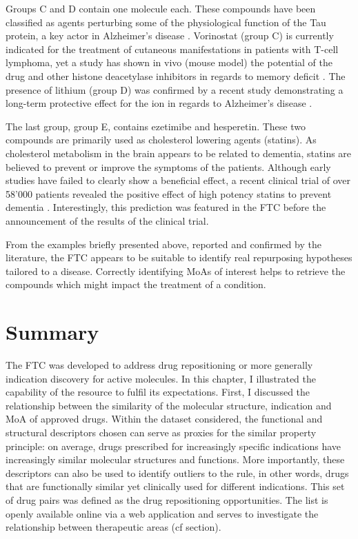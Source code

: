 Groups C and D contain one molecule each. These compounds have been classified as agents perturbing some of the physiological function of the Tau protein, a key actor in Alzheimer’s disease \citep{grundke1986abnormal}. Vorinostat (group C) is currently indicated for the treatment of cutaneous manifestations in patients with T-cell lymphoma, yet a study has shown in vivo (mouse model) the potential of the drug and other histone deacetylase inhibitors in regards to memory deficit \citep{kilgore2010inhibitors}. The presence of lithium (group D) was confirmed by a recent study demonstrating a long-term protective effect for the ion in regards to Alzheimer’s disease \citep{young2011more}.

The last group, group E, contains ezetimibe and hesperetin. These two compounds are primarily used as cholesterol lowering agents (statins). As cholesterol metabolism in the brain appears to be related to dementia, statins are believed to prevent or improve the symptoms of the patients. Although early studies \citep{wolozin2004cholesterol} have failed to clearly show a beneficial effect, a recent clinical trial of over 58’000 patients revealed the positive effect of high potency statins to prevent dementia \citep{esc13}. Interestingly, this prediction was featured in the FTC before the announcement of the results of the clinical trial.

From the examples briefly presented above, reported and confirmed by the literature, the FTC appears to be suitable to identify real repurposing hypotheses tailored to a disease. Correctly identifying MoAs of interest helps to retrieve the compounds which might impact the treatment of a condition.

\section{Summary}
The FTC was developed to address drug repositioning or more generally indication discovery for active molecules. In this chapter, I illustrated the capability of the resource to fulfil its expectations. First, I discussed the relationship between the similarity of the molecular structure, indication and MoA of approved drugs. Within the dataset considered, the functional and structural descriptors chosen can serve as proxies for the similar property principle: on average, drugs prescribed for increasingly specific indications have increasingly similar molecular structures and functions. More importantly, these descriptors can also be used to identify outliers to the rule, in other words, drugs that are functionally similar yet clinically used for different indications. This set of drug pairs was defined as the drug repositioning opportunities. The list is openly available online via a web application and serves to investigate the relationship between therapeutic areas (cf section).

